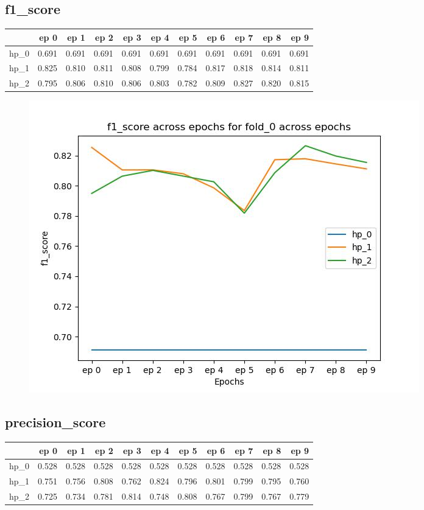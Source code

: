 \documentclass{article}
\begin{document}
\subsection{f1\_score}
\begin{tabular}{lrrrrrrrrrr}
\toprule
{} &   ep 0 &   ep 1 &   ep 2 &   ep 3 &   ep 4 &   ep 5 &   ep 6 &   ep 7 &   ep 8 &   ep 9 \\
\midrule
hp\_0 &  0.691 &  0.691 &  0.691 &  0.691 &  0.691 &  0.691 &  0.691 &  0.691 &  0.691 &  0.691 \\
hp\_1 &  0.825 &  0.810 &  0.811 &  0.808 &  0.799 &  0.784 &  0.817 &  0.818 &  0.814 &  0.811 \\
hp\_2 &  0.795 &  0.806 &  0.810 &  0.806 &  0.803 &  0.782 &  0.809 &  0.827 &  0.820 &  0.815 \\
\bottomrule
\end{tabular}

\begin{figure}[H]
\includegraphics[scale = 0.75]{fold_0/f1_score}
\end{figure}
\subsection{precision\_score}
\begin{tabular}{lrrrrrrrrrr}
\toprule
{} &   ep 0 &   ep 1 &   ep 2 &   ep 3 &   ep 4 &   ep 5 &   ep 6 &   ep 7 &   ep 8 &   ep 9 \\
\midrule
hp\_0 &  0.528 &  0.528 &  0.528 &  0.528 &  0.528 &  0.528 &  0.528 &  0.528 &  0.528 &  0.528 \\
hp\_1 &  0.751 &  0.756 &  0.808 &  0.762 &  0.824 &  0.796 &  0.801 &  0.799 &  0.795 &  0.760 \\
hp\_2 &  0.725 &  0.734 &  0.781 &  0.814 &  0.748 &  0.808 &  0.767 &  0.799 &  0.767 &  0.779 \\
\bottomrule
\end{tabular}
\end{document}
